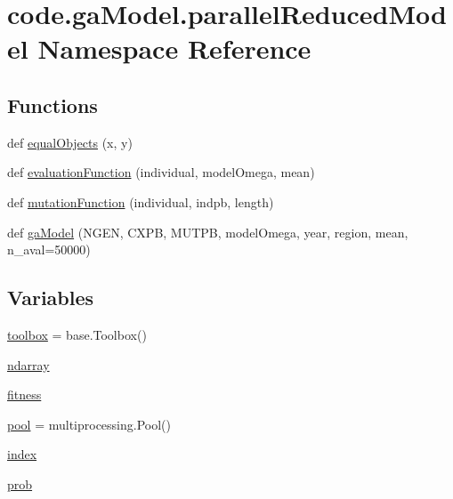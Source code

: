 \hypertarget{namespacecode_1_1ga_model_1_1parallel_reduced_model}{}\section{code.\+ga\+Model.\+parallel\+Reduced\+Model Namespace Reference}
\label{namespacecode_1_1ga_model_1_1parallel_reduced_model}
\subsection*{Functions}
\begin{DoxyCompactItemize}
\item 
def \hyperlink{namespacecode_1_1ga_model_1_1parallel_reduced_model_a61e22526caf65f125a0aeaad8e581e6f}{equal\+Objects} (x, y)
\item 
def \hyperlink{namespacecode_1_1ga_model_1_1parallel_reduced_model_a7b78703451d4d1110a047a4098ceecea}{evaluation\+Function} (individual, model\+Omega, mean)
\item 
def \hyperlink{namespacecode_1_1ga_model_1_1parallel_reduced_model_aae0733eaea88fe32d2b0f982402ae160}{mutation\+Function} (individual, indpb, length)
\item 
def \hyperlink{namespacecode_1_1ga_model_1_1parallel_reduced_model_a897e7048ecbba7fd1155868a9b8858f9}{ga\+Model} (N\+G\+EN, C\+X\+PB, M\+U\+T\+PB, model\+Omega, year, region, mean, n\+\_\+aval=50000)
\end{DoxyCompactItemize}
\subsection*{Variables}
\begin{DoxyCompactItemize}
\item 
\hyperlink{namespacecode_1_1ga_model_1_1parallel_reduced_model_acb750d4b16db1f5e7cd91c159220be50}{toolbox} = base.\+Toolbox()
\item 
\hyperlink{namespacecode_1_1ga_model_1_1parallel_reduced_model_a1122366f82f606595622d9a82207f694}{ndarray}
\item 
\hyperlink{namespacecode_1_1ga_model_1_1parallel_reduced_model_a173904077397c736050b361163656cb1}{fitness}
\item 
\hyperlink{namespacecode_1_1ga_model_1_1parallel_reduced_model_af143651849218812a26931ddd8f0e06d}{pool} = multiprocessing.\+Pool()
\item 
\hyperlink{namespacecode_1_1ga_model_1_1parallel_reduced_model_a83a1e905cdec62ce256ac99f2c629ec0}{index}
\item 
\hyperlink{namespacecode_1_1ga_model_1_1parallel_reduced_model_a48f571e8c9931f64b4c0afa1b01f6342}{prob}
\end{DoxyCompactItemize}


